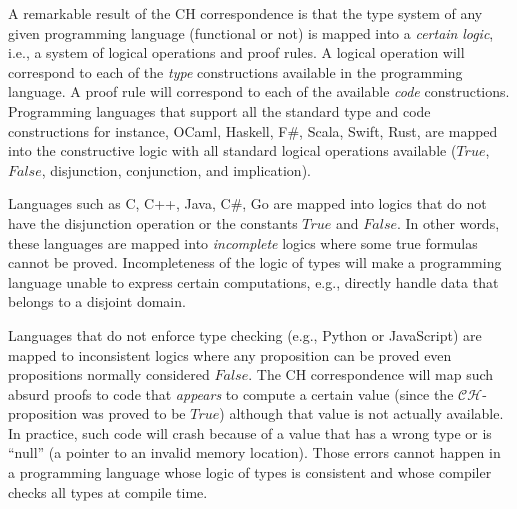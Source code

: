 A remarkable result of the CH correspondence is that the type system
of any given programming language (functional or not) is mapped into
a \emph{certain} \emph{logic}, i.e., a system of logical operations
and proof rules. A logical operation will correspond to each of the
\emph{type} constructions available in the programming language. A
proof rule will correspond to each of the available \emph{code} constructions.
Programming languages that support all the standard type and code
constructions \textemdash{} for instance, OCaml, Haskell, F\#, Scala,
Swift, Rust, \textemdash{} are mapped into the constructive logic
with all standard logical operations available ($True$, $False$,
disjunction, conjunction, and implication).

Languages such as C, C++, Java, C\#, Go are mapped into logics that
do not have the disjunction operation or the constants $True$ and
$False$. In other words, these languages are mapped into \emph{incomplete}
logics where some true formulas cannot be proved. Incompleteness of
the logic of types will make a programming language unable to express
certain computations, e.g., directly handle data that belongs to a
disjoint domain. 

Languages that do not enforce type checking (e.g., Python or JavaScript)
are mapped to inconsistent logics where any proposition can be proved
\textemdash{} even propositions normally considered $False$. The
CH correspondence will map such absurd proofs to code that \emph{appears}
to compute a certain value (since the $\mathcal{CH}$-proposition
was proved to be $True$) although that value is not actually available.
In practice, such code will crash because of a value that has a wrong
type or is \textsf{``}null\textsf{''} (a pointer to an invalid memory location). Those
errors cannot happen in a programming language whose logic of types
is consistent and whose compiler checks all types at compile time. 

